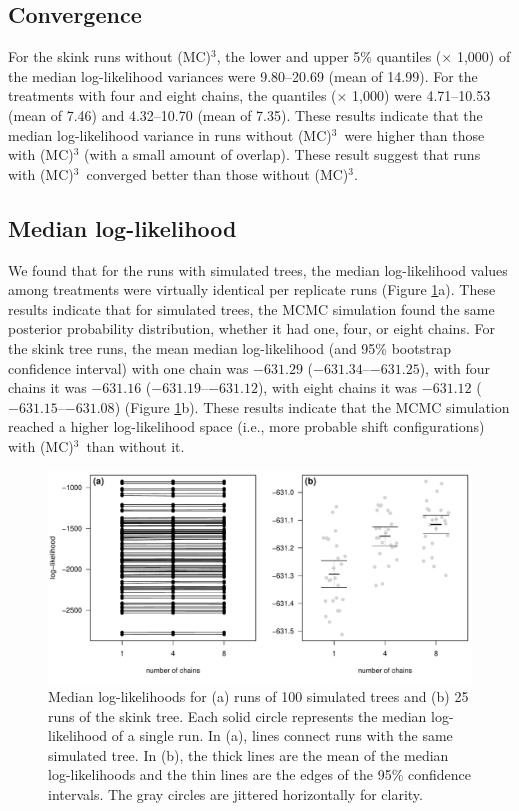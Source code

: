 \documentclass[12pt]{article}
\newcommand{\MCMCMC}{(MC)$^{3}$}
\begin{document}
\subsection*{Convergence}

For the skink runs without \MCMCMC,
the lower and upper 5\% quantiles ($\times$ 1,000)
of the median log-likelihood variances were 9.80--20.69 (mean of 14.99).
%
For the treatments with four and eight chains,
the quantiles ($\times$ 1,000) were 4.71--10.53 (mean of 7.46)
and 4.32--10.70 (mean of 7.35).
%
These results indicate that the median log-likelihood variance
in runs without \MCMCMC\ were higher than those with \MCMCMC
(with a small amount of overlap).
%
These result suggest that runs with \MCMCMC\ 
converged better than those without \MCMCMC.


\subsection*{Median log-likelihood}

We found that for the runs with simulated trees,
the median log-likelihood values among treatments
were virtually identical per replicate runs (Figure \ref{fig:median-log-like}a).
%
These results indicate that for simulated trees,
the MCMC simulation found the same posterior probability distribution,
whether it had one, four, or eight chains.
%
For the skink tree runs,
the mean median log-likelihood (and 95\% bootstrap confidence interval)
with one chain was $-631.29$ ($-631.34$--$-631.25$),
with four chains it was $-631.16$ ($-631.19$--$-631.12$),
with eight chains it was $-631.12$ ($-631.15$--$-631.08$)
(Figure \ref{fig:median-log-like}b).
%
These results indicate that the MCMC simulation
reached a higher log-likelihood space
(i.e., more probable shift configurations)
with \MCMCMC\ than without it.

\begin{figure}
\begin{center}
\includegraphics[width=14cm]{median-log-like.pdf}
\end{center}
\caption{Median log-likelihoods for (a) runs of 100 simulated trees
    and (b) 25 runs of the skink tree.
    Each solid circle represents the median log-likelihood of a single run.
    In (a), lines connect runs with the same simulated tree.
    In (b), the thick lines are the mean of the median log-likelihoods
    and the thin lines are the edges of the 95\% confidence intervals.
    The gray circles are jittered horizontally for clarity.}
\label{fig:median-log-like}
\end{figure}
\end{document}
